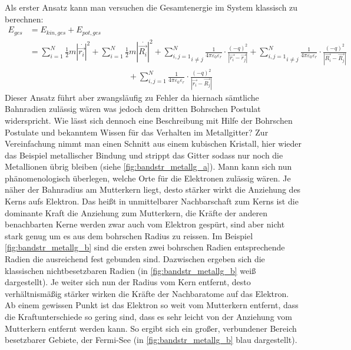 Als erster Ansatz kann man versuchen die Gesamtenergie im System klassisch zu berechnen:
\begin{align}
	E_{ges} &= E_{kin,ges} + E_{pot,ges} \nonumber \\
	&= \sum\limits_{i=1}^N \frac{1}{2}m|\overset{\cdot}{\vec{r_i}}|^2 + \sum\limits_{i=1}^N \frac{1}{2}m|\overset{\cdot}{\vec{R_i}}|^2 + \underset{i \neq j}{\sum\limits_{i,j=1}^N} \frac{1}{4 \pi \varepsilon_0 \varepsilon_r} \cdot \frac{(-q)^2}{|\vec{r_i} - \vec{r_j}|}+ \underset{i \neq j}{\sum\limits_{i,j=1}^N} \frac{1}{4 \pi \varepsilon_0 \varepsilon_r} \cdot \frac{(-q)^2}{|\vec{R_i} - \vec{R_j}|} \nonumber\\ &\qquad \qquad \qquad \qquad \qquad \qquad + \sum\limits_{i,j=1}^N \frac{1}{4 \pi \varepsilon_0 \varepsilon_r} \cdot \frac{(-q)^2}{|\vec{r_i} - \vec{R_j}|}
\end{align}
Dieser Ansatz führt aber zwangsläufig zu Fehler da hiernach sämtliche Bahnradien zulässig wären was jedoch dem dritten Bohrschen Postulat widerspricht.
Wie lässt sich dennoch eine Beschreibung mit Hilfe der Bohrschen Postulate und bekanntem Wissen für das Verhalten im Metallgitter? Zur Vereinfachung nimmt man einen Schnitt aus einem kubischen Kristall, hier wieder das Beispiel metallischer Bindung und strippt das Gitter sodass nur noch die Metallionen übrig bleiben (siehe \ref{fig:bandstr_metallg_a}). Mann kann sich nun phänomenologisch überlegen, welche Orte für die Elektronen zulässig wären. Je näher der Bahnradius am Mutterkern liegt, desto stärker wirkt die Anziehung des Kerns aufs Elektron. Das heißt in unmittelbarer Nachbarschaft zum Kerns ist die dominante Kraft die Anziehung zum Mutterkern, die Kräfte der anderen benachbarten Kerne werden zwar auch vom Elektron gespürt, sind aber nicht stark genug um es aus dem bohrschen Radius zu reissen. Im Beispiel \ref{fig:bandstr_metallg_b} sind die ersten zwei bohrschen Radien entsprechende Radien die ausreichend fest gebunden sind. Dazwischen ergeben sich die klassischen nichtbesetzbaren Radien (in \ref{fig:bandstr_metallg_b} weiß dargestellt). Je weiter sich nun der Radius vom Kern entfernt, desto verhältnismäßig stärker wirken die Kräfte der Nachbaratome auf das Elektron. Ab einem gewissen Punkt ist das Elektron so weit vom Mutterkern entfernt, dass die Kraftunterschiede so gering sind, dass es sehr leicht von der Anziehung vom Mutterkern entfernt werden kann. So ergibt sich ein großer, verbundener Bereich besetzbarer Gebiete, der Fermi-See (in \ref{fig:bandstr_metallg_b} blau dargestellt).

